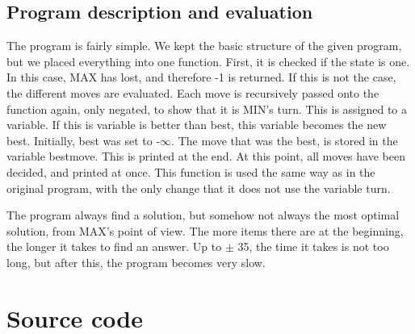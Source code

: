 \documentclass{article}
\begin{document}
	\subsection*{Program description and evaluation}
	
	The program is fairly simple. We kept the basic structure of the given program, but we placed everything into one function. First, it is checked if the state is one. In this case, MAX has lost, and therefore -1 is returned. If this is not the case, the different moves are evaluated. Each move is recursively passed onto the function again, only negated, to show that it is MIN's turn. This is assigned to a variable. If this is variable is better than best, this variable becomes the new best. Initially, best was set to -$\infty$. The move that was the best, is stored in the variable bestmove. This is printed at the end. At this point, all moves have been decided, and printed at once. This function is used the same way as in the original program, with the only change that it does not use the variable turn.
	
	The program always find a solution, but somehow not always the most optimal solution, from MAX's point of view. The more items there are at the beginning, the longer it takes to find an answer. Up to $\pm$ 35, the time it takes is not too long, but after this, the program becomes very slow. 
	
	
	\section*{Source code}
	
	
	
		
\end{document}
